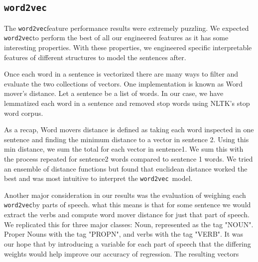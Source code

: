 \documentclass{article} %
\newcommand{\wordtvec}{\texttt{word2vec}}
\begin{document}
\subsection{\wordtvec}
The \wordtvec feature performance results were extremely puzzling. We expected \wordtvec to perform the best of all our engineered features as it has some interesting properties. With these properties, we engineered specific interpretable features of different structures to model the sentences after.

Once each word in a sentence is vectorized there are many ways to filter and evaluate the two collections of vectors. One implementation is known as Word mover's distance. Let a sentence be a list of words. In our case, we have lemmatized each word in a sentence and removed stop words using NLTK's stop word corpus. 

As a recap, Word movers distance is defined as taking each word inspected in one sentence and finding the minimum distance to a vector in sentence 2. Using this min distance, we sum the total for each vector in sentence1. We sum this with the process repeated for sentence2 words compared to sentence 1 words. 
 We tried an ensemble of distance functions but found that euclidean distance worked the best and was most intuitive to interpret the \wordtvec\ model. 

Another major consideration in our results was the evaluation of weighing each \wordtvec by parts of speech. what this means is that for some sentence we would extract the verbs and compute word mover distance for just that part of speech. We replicated this for three major classes: Noun, represented as the tag "NOUN". Proper Nouns with the tag "PROPN", and verbs with the tag "VERB". 
It was our hope that by introducing a variable for each part of speech that the differing weights would help improve our accuracy of regression. The resulting vectors
\end{document}
